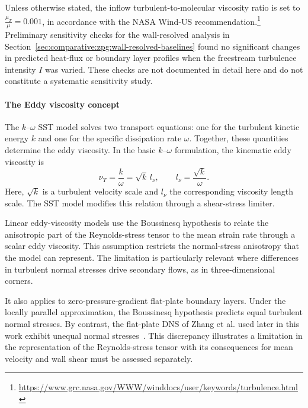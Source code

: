 Unless otherwise stated, the inflow turbulent-to-molecular viscosity ratio is set to\(\frac{\mu_T}{\mu}=0.001\), in accordance with the NASA Wind-US recommendation.\footnote{\url{https://www.grc.nasa.gov/WWW/winddocs/user/keywords/turbulence.html}} Preliminary sensitivity checks for the wall-resolved analysis in Section~\ref{sec:comparative:zpg:wall-resolved-baselines} found no significant changes in predicted heat-flux or boundary layer profiles when the freestream turbulence intensity \(I\) was varied. These checks are not documented in detail here and do not constitute a systematic sensitivity study.

\paragraph*{The Eddy viscosity concept}
\label{subsec:background:eddy-viscosity}

The \(k\)--\(\omega\) SST model solves two transport equations: one for the turbulent kinetic energy \(k\) and one for the specific dissipation rate \(\omega\). Together, these quantities determine the eddy viscosity. In the basic \(k\)--\(\omega\) formulation, the kinematic eddy viscosity is
\begin{equation}
    \nu_T = \frac{k}{\omega}
          = \sqrt{k}\,l_\nu,
    \qquad
    l_\nu = \frac{\sqrt{k}}{\omega}.
\end{equation}
Here, \(\sqrt{k}\) is a turbulent velocity scale and \(l_\nu\) the corresponding viscosity length scale. The SST model modifies this relation through a shear-stress limiter.
\par\medskip

Linear eddy-viscosity models use the Boussinesq hypothesis to relate the anisotropic part of the Reynolds-stress tensor to the mean strain rate through a scalar eddy viscosity. This assumption restricts the normal-stress anisotropy that the model can represent. The limitation is particularly relevant where differences in turbulent normal stresses drive secondary flows, as in three-dimensional corners.
\par\medskip

It also applies to zero-pressure-gradient flat-plate boundary layers. Under the locally parallel approximation, the Boussinesq hypothesis predicts equal turbulent normal stresses. By contrast, the flat-plate DNS of Zhang et al. used later in this work exhibit unequal normal stresses~\cite[Figure~13(a,c)]{zhang2018direct}. This discrepancy illustrates a limitation in the representation of the Reynolds-stress tensor with its consequences for mean velocity and wall shear must be assessed separately.
\par\medskip

